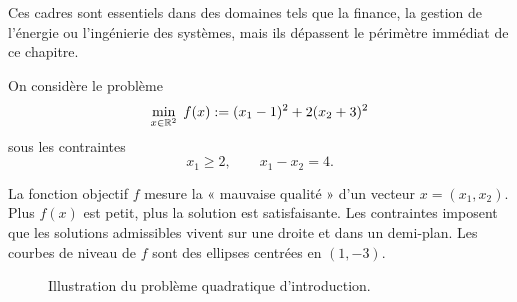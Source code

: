 Ces cadres sont essentiels dans des domaines tels que la finance, la gestion de l’énergie
ou l’ingénierie des systèmes, mais ils dépassent le périmètre immédiat de ce chapitre.

\begin{exemple}
On considère le problème
\begin{equation}
  \min_{x \in \mathbb{R}^2} \; f(x)
  := (x_1 - 1)^2 + 2(x_2 + 3)^2
  \label{eq:intro-exemple-obj}
\end{equation}
sous les contraintes
\begin{equation}
  x_1 \geq 2, 
  \qquad
  x_1 - x_2 = 4.
  \label{eq:intro-exemple-constraints}
\end{equation}
\end{exemple}

La fonction objectif $f$ mesure la « mauvaise qualité » d’un vecteur $x=(x_1,x_2)$.
Plus $f(x)$ est petit, plus la solution est satisfaisante. Les contraintes imposent que les
solutions admissibles vivent sur une droite et dans un demi-plan. Les courbes de niveau
de $f$ sont des ellipses centrées en $(1,-3)$.

\begin{figure}[H]
  \centering
  \caption{Illustration du problème quadratique d'introduction.}
  \label{fig:intro-exemple}
\end{figure}

